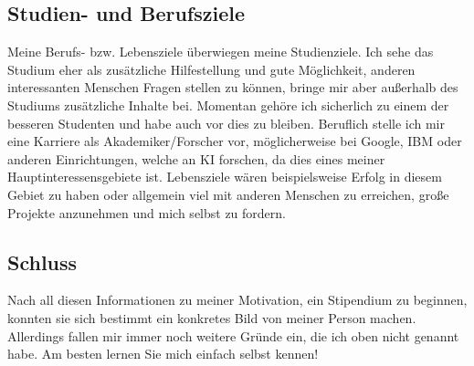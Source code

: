 \documentclass{scrartcl}
\begin{document}
\subsection*{Studien- und Berufsziele}


Meine Berufs- bzw. Lebensziele überwiegen meine Studienziele. Ich sehe das Studium eher als
zusätzliche Hilfestellung und gute Möglichkeit, anderen interessanten Menschen Fragen stellen
zu können, bringe mir aber außerhalb des Studiums zusätzliche Inhalte bei. Momentan gehöre
ich sicherlich zu einem der besseren Studenten und habe auch vor dies zu bleiben. Beruflich stelle
ich mir eine Karriere als Akademiker/Forscher vor, möglicherweise bei Google, IBM oder anderen
Einrichtungen, welche an KI forschen, da dies eines meiner Hauptinteressensgebiete ist. Lebensziele
wären beispielsweise Erfolg in diesem Gebiet zu haben oder allgemein viel mit anderen Menschen
zu erreichen, große Projekte anzunehmen und mich selbst zu fordern.




\subsection*{Schluss}
Nach all diesen Informationen zu meiner Motivation, ein Stipendium zu beginnen, konnten sie
sich bestimmt ein konkretes Bild von meiner Person machen. Allerdings fallen mir immer noch
weitere Gründe ein, die ich oben nicht genannt habe. Am besten lernen Sie mich einfach selbst kennen!
\end{document}
